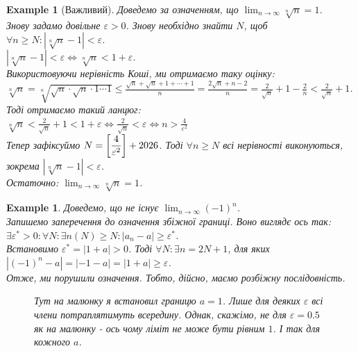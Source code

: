 \documentclass[a4paper, 14pt]{article}
\theoremstyle{theoremdd}
\theoremstyle{theoremdd}
\theoremstyle{theoremdd}
\theoremstyle{theoremdd}
\newtheorem{example}[theorem]{Example}
\theoremstyle{theoremdd}
\theoremstyle{theoremdd}
\theoremstyle{theoremdd}
\theoremstyle{theoremdd}
\begin{document}
	\begin{example}[Важливий]
	Доведемо за означенням, що $\displaystyle\lim_{n \to \infty} \sqrt[n]{n}=1$.\\
	Знову задамо довільне $\varepsilon > 0$. Знову необхідно знайти $N$, щоб $\displaystyle \forall n \geq N: \left|\sqrt[n]{n}-1  \right|<\varepsilon$.\\
	$\left|\sqrt[n]{n}-1  \right|<\varepsilon \iff \sqrt[n]{n}<1+\varepsilon$.\\
	Використовуючи нерівність Коші, ми отримаємо таку оцінку:\\
	$\displaystyle \sqrt[n]{n}= \sqrt[n]{\sqrt{n}\cdot\sqrt{n}\cdot 1 \cdots 1} \leq \frac{\sqrt{n}+\sqrt{n}+1+\cdots+1}{n} = \frac{2\sqrt{n}+n-2}{n} = \frac{2}{\sqrt{n}}+1-\frac{2}{n}<\frac{2}{\sqrt{n}}+1$. \\
	Тоді отримаємо такий ланцюг:\\
	$\displaystyle \sqrt[n]{n} < \frac{2}{\sqrt{n}} + 1 < 1 + \varepsilon \iff \frac{2}{\sqrt{n}} < \varepsilon \iff n > \frac{4}{\varepsilon^2}$\\
	Тепер зафіксуймо $\displaystyle N = \left[\frac{4}{\varepsilon^2} \right] + \the\year$. Тоді $\forall n \geq N$ всі нерівності виконуються, зокрема $\left|\sqrt[n]{n}-1  \right|<\varepsilon$.\\
	Остаточно: $\displaystyle\lim_{n \to \infty} \sqrt[n]{n}=1$.
	\end{example}
	
	\begin{example}
	\label{example_of_divergent_sequence}
	Доведемо, що не існує $\displaystyle \lim_{n \to \infty} (-1)^n$.\\
	Запишемо заперечення до означення збіжної границі. Воно виглядє ось так:\\
	$\exists \varepsilon^* > 0: \forall N: \exists n(N) \geq N: |a_n - a| \geq \varepsilon^*$.\\
	Встановимо $\varepsilon^* = |1+a| > 0$. Тоді $\forall N: \exists n = 2N+1$, для яких $|(-1)^n - a|= |-1-a| = |1+a| \geq \varepsilon$.\\
	Отже, ми порушили означення. Тобто, дійсно, маємо розбіжну послідовність.
\begin{figure}[H]
\centering
\resizebox{0.5\textwidth}{!} {
}
\caption*{Тут на малюнку я встановил границю $a=1$. Лише для деяких $\varepsilon$ всі члени потраплятимуть всередину. Однак, скажімо, не для $\varepsilon = 0.5$ як на малюнку - ось чому ліміт не може бути рівним $1$. І так для кожного $a$.}
\end{figure}
	\end{example}
	
\end{document}
